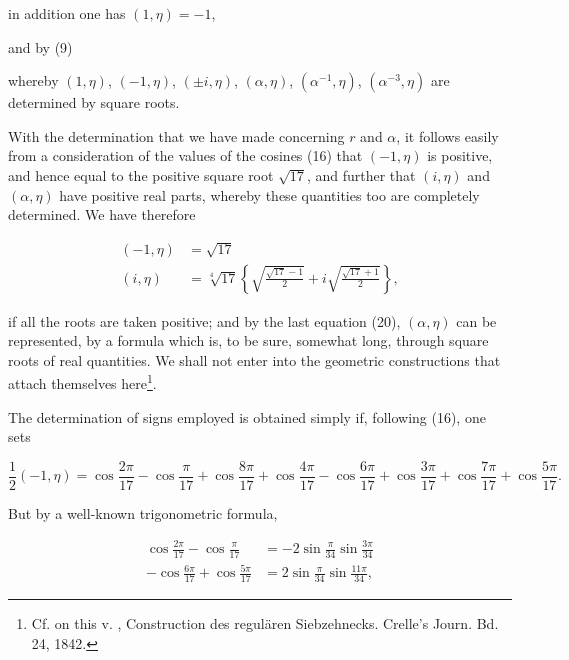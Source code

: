 
in addition one has $(1,\eta) = -1$,


and by (9)


whereby $(1,\eta)$, $(-1,\eta)$, $(\pm i,\eta)$, $(\alpha,\eta)$, $(\alpha^{-1},\eta)$, $(\alpha^{-3},\eta)$ are
determined by square roots.

With the determination that we have made concerning $r$ and $\alpha$,
it follows easily from a consideration of the values of the cosines
(16) that $(-1,\eta)$ is positive, and hence equal to the positive square root
$\sqrt{17}$, and further that $(i,\eta)$ and $(\alpha,\eta)$ have positive real
parts, whereby these quantities too are completely determined.
We have therefore

\[
\begin{aligned}
(-1,\eta) &= \sqrt{17} \\
(i,\eta) &= \sqrt[4]{17}\left\{\sqrt{\frac{\sqrt{17}-1}{2}} + i\sqrt{\frac{\sqrt{17}+1}{2}}\right\},
\end{aligned}
\]

if all the roots are taken positive; and by the last
equation (20), $(\alpha,\eta)$ can be represented, by a formula which is,
to be sure, somewhat long, through square roots of real quantities.
We shall not enter into the geometric constructions that
attach themselves here\footnote{Cf. on this v. , Construction des regulären Siebzehnecks. Crelle's Journ. Bd. 24, 1842.}.

The determination of signs employed is obtained simply
if, following (16), one sets

\[
\frac{1}{2}(-1,\eta) = \cos\frac{2\pi}{17} - \cos\frac{\pi}{17} + \cos\frac{8\pi}{17} + \cos\frac{4\pi}{17}
- \cos\frac{6\pi}{17} + \cos\frac{3\pi}{17} + \cos\frac{7\pi}{17} + \cos\frac{5\pi}{17}.
\]

But by a well-known trigonometric formula,

\[
\begin{aligned}
\cos\frac{2\pi}{17} - \cos\frac{\pi}{17} &= -2\sin\frac{\pi}{34}\sin\frac{3\pi}{34} \\
-\cos\frac{6\pi}{17} + \cos\frac{5\pi}{17} &= 2\sin\frac{\pi}{34}\sin\frac{11\pi}{34},
\end{aligned}
\]
